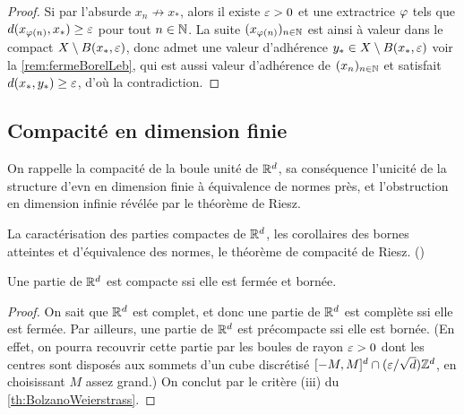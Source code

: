 \begin{proof}
	Si par l'absurde $x_n \not \to x_*$, alors il existe $\varepsilon>0$ et une extractrice $\varphi$ tels que $d(x_{\varphi(n)},x_*) \geq \varepsilon$ pour tout $n \in \mathbb{N}$. 
	La suite $(x_{\varphi(n)})_{n \in \mathbb{N}}$ est ainsi à valeur dans le compact $X \setminus B(x_*,\varepsilon)$, donc admet une valeur d'adhérence $y_*\in X \setminus B(x_*,\varepsilon)$ voir la \cref{rem:fermeBorelLeb}, qui est aussi valeur d'adhérence de $(x_n)_{n \in \mathbb{N}}$ et satisfait $d(x_*,y_*) \geq \varepsilon$, d'où la contradiction.
\end{proof}

\subsection{Compacité en dimension finie}
\label{subsec:compactRd}

On rappelle la compacité de la boule unité de $\mathbb{R}^d$, sa conséquence l'unicité de la structure d'evn en dimension finie à équivalence de normes près, et l'obstruction en dimension infinie révélée par le théorème de Riesz. 

\begin{retenir}
La caractérisation des parties compactes de $\mathbb{R}^d$, les corollaires des bornes atteintes et d'équivalence des normes, le théorème de compacité de Riesz. 
()
\end{retenir}

\begin{proposition}
\label{prop:compSsiFermeBorne}
%
Une partie de $\mathbb{R}^d$ est compacte ssi elle est fermée et bornée.	
\end{proposition}

\begin{proof}
	On sait que $\mathbb{R}^d$ est complet, et donc une partie de $\mathbb{R}^d$ est complète ssi elle est fermée.
	Par ailleurs, une partie de $\mathbb{R}^d$ est précompacte ssi elle est bornée. 
	(En effet, on pourra recouvrir cette partie par les boules de rayon $\varepsilon > 0$ dont les centres sont disposés aux sommets d'un cube discrétisé $[-M,M]^d \cap (\varepsilon/\sqrt d) \mathbb{Z}^d$, en choisissant $M$ assez grand.)
	On conclut par le critère (iii) du \cref{th:BolzanoWeierstrass}.
\end{proof}


